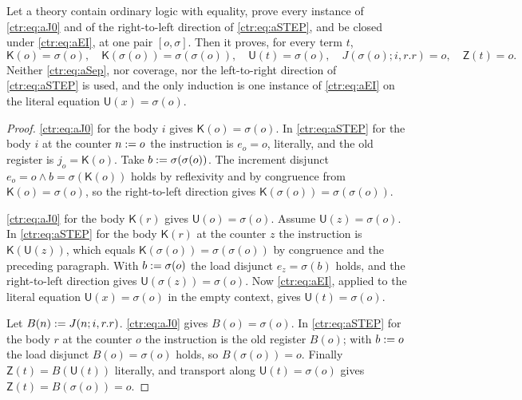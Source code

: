 \begin{lemma}\label{ctr:lem:cfconst}
Let a theory contain ordinary logic with equality, prove every instance of
\eqref{ctr:eq:aJ0} and of the right-to-left direction of \eqref{ctr:eq:aSTEP}, and be
closed under \eqref{ctr:eq:aEI}, at one pair $[o,\sigma]$. Then it proves, for every term
$t$,
\[
 \mathsf K(o)=\sigma(o),\quad \mathsf K(\sigma(o))=\sigma(\sigma(o)),\quad
 \mathsf U(t)=\sigma(o),\quad J(\sigma(o);i,r.r)=o,\quad \mathsf Z(t)=o .
\]
Neither \eqref{ctr:eq:aSep}, nor coverage, nor the left-to-right direction of
\eqref{ctr:eq:aSTEP} is used, and the only induction is one instance of
\eqref{ctr:eq:aEI} on the literal equation $\mathsf U(x)=\sigma(o)$.
\end{lemma}
\begin{proof}
\eqref{ctr:eq:aJ0} for the body $i$ gives $\mathsf K(o)=\sigma(o)$. In
\eqref{ctr:eq:aSTEP} for the body $i$ at the counter $n\mathrel{:=} o$ the instruction is
$e_o=o$, literally, and the old register is $j_o=\mathsf K(o)$. Take
$b\mathrel{:=}\sigma(\sigma(o))$. The increment disjunct $e_o=o\land b=\sigma(\mathsf K(o))$ holds
by reflexivity and by congruence from $\mathsf K(o)=\sigma(o)$, so the right-to-left
direction gives $\mathsf K(\sigma(o))=\sigma(\sigma(o))$.

\eqref{ctr:eq:aJ0} for the body $\mathsf K(r)$ gives $\mathsf U(o)=\sigma(o)$. Assume
$\mathsf U(z)=\sigma(o)$. In \eqref{ctr:eq:aSTEP} for the body $\mathsf K(r)$ at the counter
$z$ the instruction is $\mathsf K(\mathsf U(z))$, which equals
$\mathsf K(\sigma(o))=\sigma(\sigma(o))$ by congruence and the preceding paragraph. With
$b\mathrel{:=}\sigma(o)$ the load disjunct $e_z=\sigma(b)$ holds, and the right-to-left direction
gives $\mathsf U(\sigma(z))=\sigma(o)$. Now \eqref{ctr:eq:aEI}, applied to the literal
equation $\mathsf U(x)=\sigma(o)$ in the empty context, gives $\mathsf U(t)=\sigma(o)$.

Let $B(n)\mathrel{:=} J(n;i,r.r)$. \eqref{ctr:eq:aJ0} gives $B(o)=\sigma(o)$. In
\eqref{ctr:eq:aSTEP} for the body $r$ at the counter $o$ the instruction is the old register
$B(o)$; with $b\mathrel{:=} o$ the load disjunct $B(o)=\sigma(o)$ holds, so $B(\sigma(o))=o$.
Finally $\mathsf Z(t)=B(\mathsf U(t))$ literally, and transport along
$\mathsf U(t)=\sigma(o)$ gives $\mathsf Z(t)=B(\sigma(o))=o$.
\end{proof}

